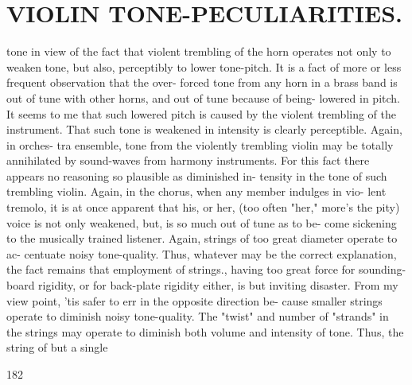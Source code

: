 \documentclass{article}
\begin{document}
\section*{VIOLIN TONE-PECULIARITIES.}
tone in view of the fact that violent trembling of the horn operates not only to weaken tone, but also, perceptibly to lower tone-pitch. It is a fact of more or less frequent observation that the over- forced tone from any horn in a brass band is out of tune with other horns, and out of tune because of being- lowered in pitch. It seems to me that such lowered pitch is caused by the violent trembling of the instrument. That such tone is weakened in intensity is clearly perceptible. Again, in orches- tra ensemble, tone from the violently trembling violin may be totally annihilated by sound-waves from harmony instruments. For this fact there appears no reasoning so plausible as diminished in- tensity in the tone of such trembling violin. Again, in the chorus, when any member indulges in vio- lent tremolo, it is at once apparent that his, or her, (too often "her," more's the pity) voice is not only weakened, but, is so much out of tune as to be- come sickening to the musically trained listener. Again, strings of too great diameter operate to ac- centuate noisy tone-quality. Thus, whatever may be the correct explanation, the fact remains that employment of strings., having too great force for sounding-board rigidity, or for back-plate rigidity either, is but inviting disaster. From my view point, 'tis safer to err in the opposite direction be- cause smaller strings operate to diminish noisy tone-quality. The "twist" and number of "strands" in the strings may operate to diminish both volume and intensity of tone. Thus, the string of but a single

182
\end{document}
